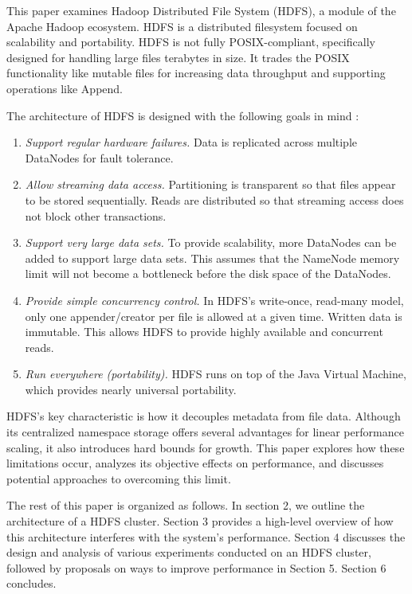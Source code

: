 \documentclass[11pt, a4paper]{article}
\begin{document}
\begin{multicols*}{2}
This paper examines Hadoop Distributed File System (HDFS), a module of the Apache Hadoop ecosystem. HDFS is a distributed filesystem focused on scalability and portability. HDFS is not fully POSIX-compliant, specifically designed for handling large files terabytes in size. It trades the POSIX functionality like mutable files for increasing data throughput and supporting operations like Append.

The architecture of HDFS is designed with the following goals in mind \cite{HdfsGuide}:
\begin{enumerate}[noitemsep, label=\arabic*.]
	\item\textit{Support regular hardware failures.} Data is replicated across multiple DataNodes for fault tolerance.
	\item\textit{Allow streaming data access.} Partitioning is transparent so that files appear to be stored sequentially. Reads are distributed so that streaming access does not block other transactions.
	\item\textit{Support very large data sets.} To provide scalability, more DataNodes can be added to support large data sets. This assumes that the NameNode memory limit will not become a bottleneck before the disk space of the DataNodes.
	\item\textit{Provide simple concurrency control.} In HDFS's write-once, read-many model, only one appender/creator per file is allowed at a given time. Written data is immutable. This allows HDFS to provide highly available and concurrent reads.
	\item\textit{Run everywhere (portability).} HDFS runs on top of the Java Virtual Machine, which provides nearly universal portability.
\end{enumerate}

HDFS's key characteristic is how it decouples metadata from file data. Although its centralized namespace storage offers several advantages for linear performance scaling, it also introduces hard bounds for growth. This paper explores how these limitations occur, analyzes its objective effects on performance, and discusses potential approaches to overcoming this limit.

The rest of this paper is organized as follows. In section 2, we outline the architecture of a HDFS cluster. Section 3 provides a high-level overview of how this architecture interferes with the system's performance. Section 4 discusses the design and analysis of various experiments conducted on an HDFS cluster, followed by proposals on ways to improve performance in Section 5. Section 6 concludes.

\end{multicols*}
\end{document}
